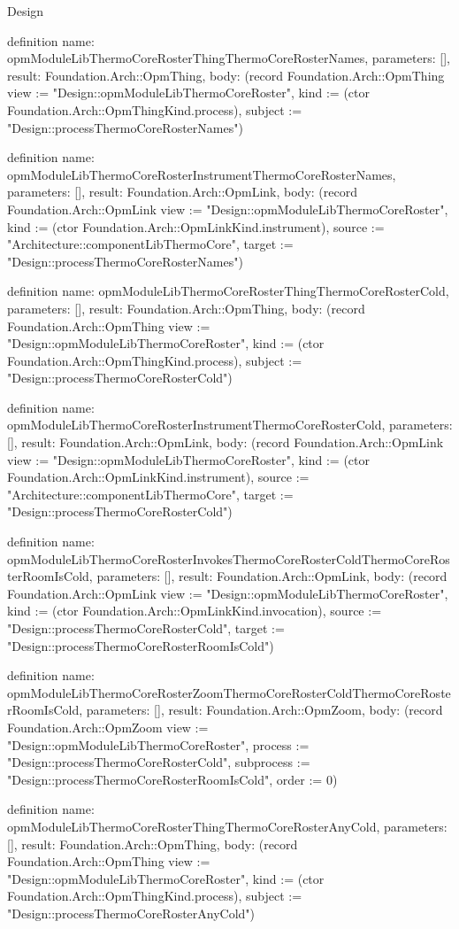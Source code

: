 \begin{lexlean}{Design}
\begin{semanticmodule}
definition{
  name: opmModuleLibThermoCoreRosterThingThermoCoreRosterNames,
  parameters: [],
  result: Foundation.Arch::OpmThing,
  body: (record Foundation.Arch::OpmThing {view := "Design::opmModuleLibThermoCoreRoster", kind := (ctor Foundation.Arch::OpmThingKind.process), subject := "Design::processThermoCoreRosterNames"})
}

definition{
  name: opmModuleLibThermoCoreRosterInstrumentThermoCoreRosterNames,
  parameters: [],
  result: Foundation.Arch::OpmLink,
  body: (record Foundation.Arch::OpmLink {view := "Design::opmModuleLibThermoCoreRoster", kind := (ctor Foundation.Arch::OpmLinkKind.instrument), source := "Architecture::componentLibThermoCore", target := "Design::processThermoCoreRosterNames"})
}

definition{
  name: opmModuleLibThermoCoreRosterThingThermoCoreRosterCold,
  parameters: [],
  result: Foundation.Arch::OpmThing,
  body: (record Foundation.Arch::OpmThing {view := "Design::opmModuleLibThermoCoreRoster", kind := (ctor Foundation.Arch::OpmThingKind.process), subject := "Design::processThermoCoreRosterCold"})
}

definition{
  name: opmModuleLibThermoCoreRosterInstrumentThermoCoreRosterCold,
  parameters: [],
  result: Foundation.Arch::OpmLink,
  body: (record Foundation.Arch::OpmLink {view := "Design::opmModuleLibThermoCoreRoster", kind := (ctor Foundation.Arch::OpmLinkKind.instrument), source := "Architecture::componentLibThermoCore", target := "Design::processThermoCoreRosterCold"})
}

definition{
  name: opmModuleLibThermoCoreRosterInvokesThermoCoreRosterColdThermoCoreRosterRoomIsCold,
  parameters: [],
  result: Foundation.Arch::OpmLink,
  body: (record Foundation.Arch::OpmLink {view := "Design::opmModuleLibThermoCoreRoster", kind := (ctor Foundation.Arch::OpmLinkKind.invocation), source := "Design::processThermoCoreRosterCold", target := "Design::processThermoCoreRosterRoomIsCold"})
}

definition{
  name: opmModuleLibThermoCoreRosterZoomThermoCoreRosterColdThermoCoreRosterRoomIsCold,
  parameters: [],
  result: Foundation.Arch::OpmZoom,
  body: (record Foundation.Arch::OpmZoom {view := "Design::opmModuleLibThermoCoreRoster", process := "Design::processThermoCoreRosterCold", subprocess := "Design::processThermoCoreRosterRoomIsCold", order := 0})
}

definition{
  name: opmModuleLibThermoCoreRosterThingThermoCoreRosterAnyCold,
  parameters: [],
  result: Foundation.Arch::OpmThing,
  body: (record Foundation.Arch::OpmThing {view := "Design::opmModuleLibThermoCoreRoster", kind := (ctor Foundation.Arch::OpmThingKind.process), subject := "Design::processThermoCoreRosterAnyCold"})
}


\end{semanticmodule}
\end{lexlean}
